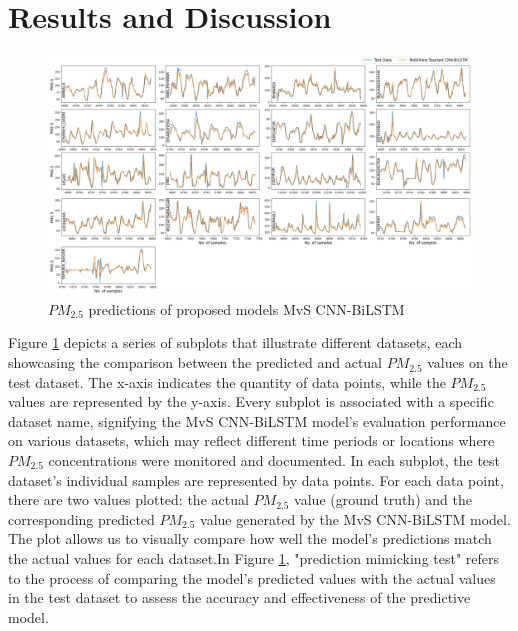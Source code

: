 \documentclass[a4paper,fleqn]{cas-dc}
\begin{document}
\section{Results and Discussion}


\begin{figure}[h!]
	\centering
		\includegraphics[scale=0.29]{img/act vs pri}
	  \caption{$PM_{2.5}$ predictions of proposed models MvS CNN-BiLSTM}\label{ACt_vs_Pred}
\end{figure}
Figure \ref{ACt_vs_Pred} depicts a series of subplots that illustrate different datasets, each showcasing the comparison between the predicted and actual $PM_{2.5}$ values on the test dataset. The x-axis indicates the quantity of data points, while the $PM_{2.5}$ values are represented by the y-axis. Every subplot is associated with a specific dataset name, signifying the MvS CNN-BiLSTM model's evaluation performance on various datasets, which may reflect different time periods or locations where $PM_{2.5}$ concentrations were monitored and documented. In each subplot, the test dataset's individual samples are represented by data points. For each data point, there are two values plotted: the actual $PM_{2.5}$ value (ground truth) and the corresponding predicted $PM_{2.5}$ value generated by the MvS CNN-BiLSTM model. The plot allows us to visually compare how well the model's predictions match the actual values for each dataset.In Figure \ref{ACt_vs_Pred}, "prediction mimicking test" refers to the process of comparing the model's predicted values with the actual values in the test dataset to assess the accuracy and effectiveness of the predictive model.
\end{document}
